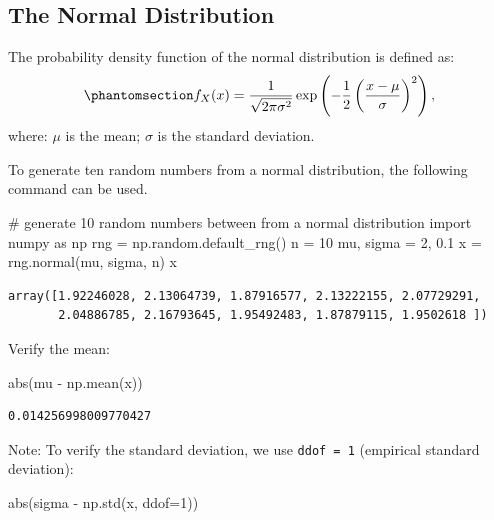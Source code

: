 \documentclass[
  letterpaper,
  DIV=11,
  numbers=noendperiod]{scrreprt}
\newenvironment{Shaded}{\begin{snugshade}}{\end{snugshade}}
\newcommand{\BuiltInTok}[1]{\textcolor[rgb]{0.00,0.23,0.31}{#1}}
\newcommand{\CommentTok}[1]{\textcolor[rgb]{0.37,0.37,0.37}{#1}}
\newcommand{\DecValTok}[1]{\textcolor[rgb]{0.68,0.00,0.00}{#1}}
\newcommand{\FloatTok}[1]{\textcolor[rgb]{0.68,0.00,0.00}{#1}}
\newcommand{\ImportTok}[1]{\textcolor[rgb]{0.00,0.46,0.62}{#1}}
\newcommand{\NormalTok}[1]{\textcolor[rgb]{0.00,0.23,0.31}{#1}}
\newcommand{\OperatorTok}[1]{\textcolor[rgb]{0.37,0.37,0.37}{#1}}
\begin{document}
\subsection{The Normal Distribution}\label{the-normal-distribution}

The probability density function of the normal distribution is defined
as: \begin{equation}\phantomsection\label{eq-normal-one}{
f_X(x) = \frac{1}{\sqrt{2\pi \sigma^2}} \exp\left(-\frac{1}{2} \left(\frac{x-\mu}{\sigma}\right)^2\right),
}\end{equation} where: \(\mu\) is the mean; \(\sigma\) is the standard
deviation.

To generate ten random numbers from a normal distribution, the following
command can be used.

\begin{Shaded}
\begin{Highlighting}[]
\CommentTok{\# generate 10 random numbers between from a normal distribution}
\ImportTok{import}\NormalTok{ numpy }\ImportTok{as}\NormalTok{ np}
\NormalTok{rng }\OperatorTok{=}\NormalTok{ np.random.default\_rng()}
\NormalTok{n }\OperatorTok{=} \DecValTok{10}
\NormalTok{mu, sigma }\OperatorTok{=} \DecValTok{2}\NormalTok{, }\FloatTok{0.1}
\NormalTok{x }\OperatorTok{=}\NormalTok{ rng.normal(mu, sigma, n)}
\NormalTok{x}
\end{Highlighting}
\end{Shaded}

\begin{verbatim}
array([1.92246028, 2.13064739, 1.87916577, 2.13222155, 2.07729291,
       2.04886785, 2.16793645, 1.95492483, 1.87879115, 1.9502618 ])
\end{verbatim}

Verify the mean:

\begin{Shaded}
\begin{Highlighting}[]
\BuiltInTok{abs}\NormalTok{(mu }\OperatorTok{{-}}\NormalTok{ np.mean(x))}
\end{Highlighting}
\end{Shaded}

\begin{verbatim}
0.014256998009770427
\end{verbatim}

Note: To verify the standard deviation, we use \texttt{ddof\ =\ 1}
(empirical standard deviation):

\begin{Shaded}
\begin{Highlighting}[]
\BuiltInTok{abs}\NormalTok{(sigma }\OperatorTok{{-}}\NormalTok{ np.std(x, ddof}\OperatorTok{=}\DecValTok{1}\NormalTok{))}
\end{Highlighting}
\end{Shaded}
\end{document}
